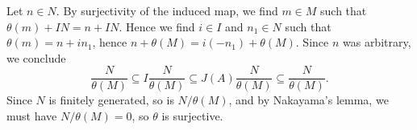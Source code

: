 Let $n \in N$. By surjectivity of the induced map, we find $m \in M$ such that
$\theta(m) + IN = n + IN$. Hence we find $i \in I$ and $n_1 \in N$ such that
$\theta(m) = n + in_1$, hence $n + \theta(M) = i(-n_1) + \theta(M)$. Since
$n$ was arbitrary, we conclude
\[ \frac{N}{\theta(M)} \subseteq I\frac{N}{\theta(M)} \subseteq J(A)\frac{N}{\theta(M)} \subseteq \frac{N}{\theta(M)}. \]
Since $N$ is finitely generated, so is $N/\theta(M)$, and by Nakayama's lemma,
we must have $N/\theta(M) = 0$, so $\theta$ is surjective.
